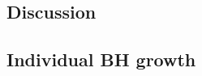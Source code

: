 \documentclass[twocolumn, twocolappendix]{aastex63}
\newcommand{\Muv}{M_{1450}}
\begin{document}
\begin{CJK*}{UTF8}{gbsn}





\section{Discussion}
\label{sec:discussion}
\vspace{2mm}
\subsection{Individual BH growth}\label{sec:evol}


\end{CJK*}
\end{document}
